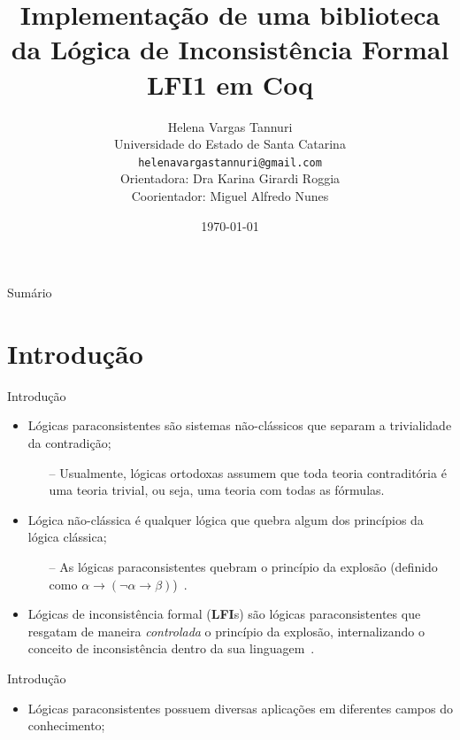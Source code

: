 \documentclass[xcolor=table]{beamer}
\title[]{Implementação de uma biblioteca da Lógica de Inconsistência Formal LFI1 em Coq}
\author[Helena Vargas Tannuri]{
    Helena Vargas Tannuri\\\smallskip
    {\scriptsize Universidade do Estado de Santa Catarina \\\smallskip
    \vspace{-2mm}
    \texttt{helenavargastannuri@gmail.com}\\\medskip
    {Orientadora: Dra Karina Girardi Roggia}\\
    {Coorientador: Miguel Alfredo Nunes}
    }
}
\date[]{\today}
\begin{document}
    \begin{frame}
        \titlepage
    \end{frame}

    \begin{frame}[allowframebreaks]{Sumário}
        \tableofcontents
    \end{frame}

    \section[]{Introdução}
    \begin{frame}{Introdução}
        \begin{itemize}
            \item Lógicas paraconsistentes são sistemas não-clássicos que separam a trivialidade da contradição;
            \begin{itemize}
                \item[--] Usualmente, lógicas ortodoxas assumem que toda teoria contraditória é uma teoria trivial, ou seja, uma teoria com todas as fórmulas.
            \end{itemize}
            \item Lógica não-clássica é qualquer lógica que quebra algum dos princípios da lógica clássica;
            \begin{itemize}
                \item[--] As lógicas paraconsistentes quebram o princípio da explosão (definido como $\alpha \to (\neg \alpha \to \beta)$)~\cite{carnielli2007}.
            \end{itemize}
            \item Lógicas de inconsistência formal (\textbf{LFI}s) são lógicas paraconsistentes que resgatam de maneira \textit{controlada} o princípio da explosão, internalizando o conceito de inconsistência dentro da sua linguagem~\cite{Carnielli_Coniglio_2016}.
        \end{itemize}
    \end{frame}

    \begin{frame}{Introdução}
        \begin{itemize}
            \item Lógicas paraconsistentes possuem diversas aplicações em diferentes campos do conhecimento;
        \end{itemize}
    \end{frame}
\end{document}
